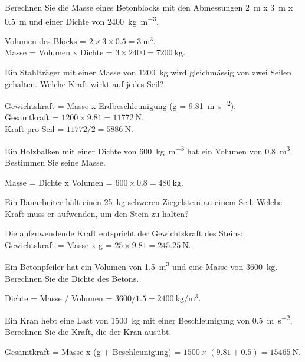 \begin{questions}

\question Berechnen Sie die Masse eines Betonblocks mit den Abmessungen \SI{2}{\meter} x \SI{3}{\meter} x \SI{0.5}{\meter} und einer Dichte von \SI{2400}{\kilogram\per\cubic\meter}.
\begin{solution}
    Volumen des Blocks = \(2 \times 3 \times 0.5 = \SI{3}{\cubic\meter}\). \\
    Masse = Volumen x Dichte = \(3 \times 2400 = \SI{7200}{\kilogram}\).
\end{solution}

\question Ein Stahlträger mit einer Masse von \SI{1200}{\kilogram} wird gleichmässig von zwei Seilen gehalten. Welche Kraft wirkt auf jedes Seil?
\begin{solution}
    Gewichtskraft = Masse x Erdbeschleunigung (g = \SI{9.81}{\meter\per\square\second}). \\
    Gesamtkraft = \(1200 \times 9.81 = \SI{11772}{\newton}\). \\
    Kraft pro Seil = \(11772 / 2 = \SI{5886}{\newton}\).
\end{solution}

\question Ein Holzbalken mit einer Dichte von \SI{600}{\kilogram\per\cubic\meter} hat ein Volumen von \SI{0.8}{\cubic\meter}. Bestimmen Sie seine Masse.
\begin{solution}
    Masse = Dichte x Volumen = \(600 \times 0.8 = \SI{480}{\kilogram}\).
\end{solution}

\question Ein Bauarbeiter hält einen \SI{25}{\kilogram} schweren Ziegelstein an einem Seil. Welche Kraft muss er aufwenden, um den Stein zu halten?
\begin{solution}
    Die aufzuwendende Kraft entspricht der Gewichtskraft des Steins: \\
    Gewichtskraft = Masse x g = \(25 \times 9.81 = \SI{245.25}{\newton}\).
\end{solution}

\question Ein Betonpfeiler hat ein Volumen von \SI{1.5}{\cubic\meter} und eine Masse von \SI{3600}{\kilogram}. Berechnen Sie die Dichte des Betons.
\begin{solution}
    Dichte = Masse / Volumen = \(3600 / 1.5 = \SI{2400}{\kilogram\per\cubic\meter}\).
\end{solution}

\question Ein Kran hebt eine Last von \SI{1500}{\kilogram} mit einer Beschleunigung von \SI{0.5}{\meter\per\square\second}. Berechnen Sie die Kraft, die der Kran ausübt.
\begin{solution}
    Gesamtkraft = Masse x (g + Beschleunigung) = \(1500 \times (9.81 + 0.5) = \SI{15465}{\newton}\).
\end{solution}


\end{questions}
